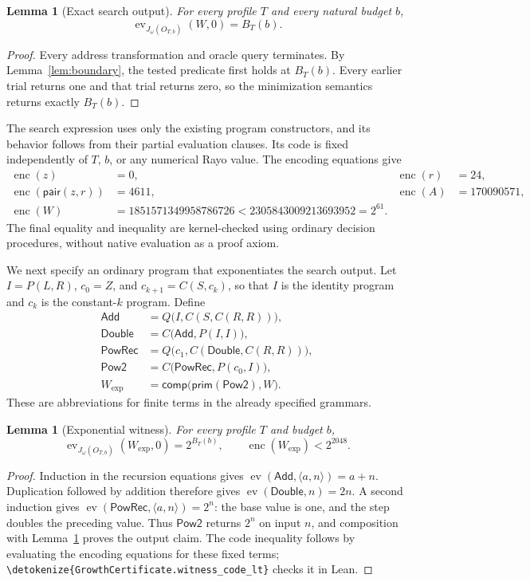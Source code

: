 \documentclass[11pt]{article}
\newtheorem{lemma}[theorem]{Lemma}
\newcommand{\ev}{\operatorname{ev}}
\newcommand{\enc}{\operatorname{enc}}
\newcommand{\pair}[2]{\langle #1,#2\rangle}
\newcommand{\code}[1]{{\small\expandafter\nolinkurl\expandafter{\detokenize{#1}}}}
\begin{document}
\begin{lemma}[Exact search output]\label{lem:witness}
For every profile $T$ and every natural budget $b$,
\[
             \ev_{J_\omega(O_{T,b})}(W,0)=B_T(b).
\]
\end{lemma}
\begin{proof}
Every address transformation and oracle query terminates. By
Lemma~\ref{lem:boundary}, the tested predicate first holds at $B_T(b)$.
Every earlier trial returns one and that trial returns zero, so the
minimization semantics returns exactly $B_T(b)$.
\end{proof}

The search expression uses only the existing program constructors, and its
behavior follows from their partial evaluation clauses. Its code is fixed
independently of $T$, $b$, or any numerical Rayo value. The encoding equations
give
\begin{align*}
 \enc(z)&=0,&\enc(r)&=24,\\
 \enc(\mathsf{pair}(z,r))&=4611,&\enc(A)&=170090571,\\
 \enc(W)&=1851571349958786726
       <2305843009213693952=2^{61}.
\end{align*}
The final equality and inequality are kernel-checked using ordinary decision
procedures, without native evaluation as a proof axiom.

We next specify an ordinary program that exponentiates the search output.
Let $I=P(L,R)$, $c_0=Z$, and $c_{k+1}=C(S,c_k)$, so that $I$ is the
identity program and $c_k$ is the constant-$k$ program. Define
\begin{align*}
 \mathsf{Add}&=Q\bigl(I,C(S,C(R,R))\bigr),\\
 \mathsf{Double}&=C\bigl(\mathsf{Add},P(I,I)\bigr),\\
 \mathsf{PowRec}&=Q\bigl(c_1,C(\mathsf{Double},C(R,R))\bigr),\\
 \mathsf{Pow2}&=C\bigl(\mathsf{PowRec},P(c_0,I)\bigr),\\
 W_{\exp}&=\mathsf{comp}\bigl(\mathsf{prim}(\mathsf{Pow2}),W\bigr).
\end{align*}
These are abbreviations for finite terms in the already specified grammars.

\begin{lemma}[Exponential witness]\label{lem:growth}
For every profile $T$ and budget $b$,
\[
 \ev_{J_\omega(O_{T,b})}(W_{\exp},0)=2^{B_T(b)},
 \qquad \enc(W_{\exp})<2^{2048}.
\]
\end{lemma}
\begin{proof}
Induction in the recursion equations gives
$\ev(\mathsf{Add},\pair an)=a+n$. Duplication followed by addition therefore
gives $\ev(\mathsf{Double},n)=2n$. A second induction gives
$\ev(\mathsf{PowRec},\pair an)=2^n$: the base value is one, and the step
doubles the preceding value. Thus $\mathsf{Pow2}$ returns $2^n$ on input
$n$, and composition with Lemma~\ref{lem:witness} proves the output claim.
The code inequality follows by evaluating the encoding equations for these
fixed terms; \code{GrowthCertificate.witness_code_lt} checks it in Lean.
\end{proof}
\end{document}
